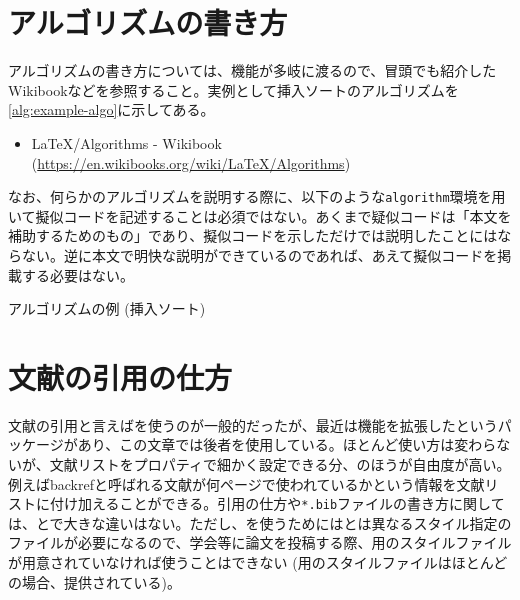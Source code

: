 \section{アルゴリズムの書き方}
\label{sec:write-algorithm}

アルゴリズムの書き方については、機能が多岐に渡るので、冒頭でも紹介したWikibookなどを参照すること。実例として挿入ソートのアルゴリズムを\cref{alg:example-algo}に示してある。
\begin{itemize}
  \item \textsf{LaTeX/Algorithms - Wikibook} \\(\url{https://en.wikibooks.org/wiki/LaTeX/Algorithms})
\end{itemize}

なお、何らかのアルゴリズムを説明する際に、以下のような\texttt{algorithm}環境を用いて擬似コードを記述することは必須ではない。あくまで疑似コードは「本文を補助するためのもの」であり、擬似コードを示しただけでは説明したことにはならない。逆に本文で明快な説明ができているのであれば、あえて擬似コードを掲載する必要はない。

\begin{algorithm}[!h]
  \caption{アルゴリズムの例 (挿入ソート)}
  \label{alg:example-algo}
  \begin{algorithmic}[1]
            \EndWhile
        \EndFor
    \EndProcedure
  \end{algorithmic}
\end{algorithm}

\section{文献の引用の仕方}
\label{sec:cite-articles}

文献の引用と言えば\bibtex を使うのが一般的だったが、最近は機能を拡張した\biblatex というパッケージがあり、この文章では後者を使用している。ほとんど使い方は変わらないが、文献リストをプロパティで細かく設定できる分、\biblatex のほうが自由度が高い。例えばbackrefと呼ばれる文献が何ページで使われているかという情報を文献リストに付け加えることができる。引用の仕方や\texttt{*.bib}ファイルの書き方に関しては、\bibtex と\biblatex で大きな違いはない。ただし、\biblatex を使うためには\bibtex とは異なるスタイル指定のファイルが必要になるので、学会等に論文を投稿する際、\biblatex 用のスタイルファイルが用意されていなければ使うことはできない (\bibtex 用のスタイルファイルはほとんどの場合、提供されている)。

